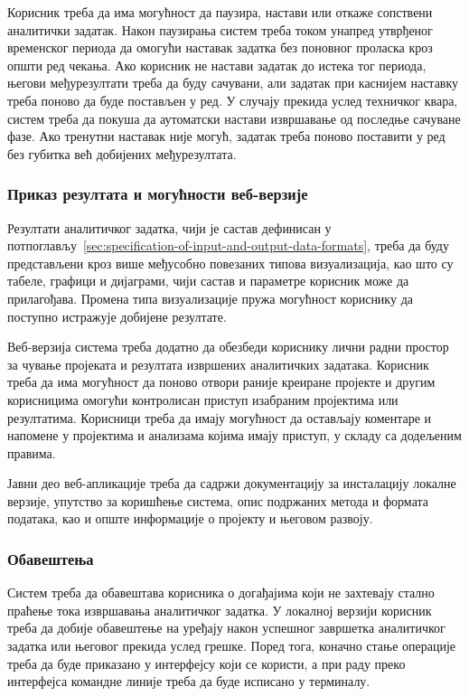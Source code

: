 \documentclass[12pt,oneside]{memoir}
\begin{document}
Корисник треба да има могућност да паузира, настави или откаже сопствени аналитички задатак. Након паузирања систем треба током унапред утврђеног временског периода да омогући наставак задатка без поновног проласка кроз општи ред чекања. Ако корисник не настави задатак до истека тог периода, његови међурезултати треба да буду сачувани, али задатак при каснијем наставку треба поново да буде постављен у ред. У случају прекида услед техничког квара, систем треба да покуша да аутоматски настави извршавање од последње сачуване фазе. Ако тренутни наставак није могућ, задатак треба поново поставити у ред без губитка већ добијених међурезултата.


\subsubsection{Приказ резултата и могућности веб-верзије}
Резултати аналитичког задатка, чији је састав дефинисан у потпоглављу~\ref{sec:specification-of-input-and-output-data-formats}, треба да буду представљени кроз више међусобно повезаних типова визуализација, као што су табеле, графици и дијаграми, чији састав и параметре корисник може да прилагођава. Промена типа визуализације пружа могућност кориснику да поступно истражује добијене резултате.

Веб-верзија система треба додатно да обезбеди кориснику лични радни простор за чување пројеката и резултата извршених аналитичких задатака. Корисник треба да има могућност да поново отвори раније креиране пројекте и другим корисницима омогући контролисан приступ изабраним пројектима или резултатима. Корисници треба да имају могућност да остављају коментаре и напомене у пројектима и анализама којима имају приступ, у складу са додељеним правима.

Јавни део веб-апликације треба да садржи документацију за инсталацију локалне верзије, упутство за коришћење система, опис подржаних метода и формата података, као и опште информације о пројекту и његовом развоју.


\subsubsection{Обавештења}
Систем треба да обавештава корисника о догађајима који не захтевају стално праћење тока извршавања аналитичког задатка. У локалној верзији корисник треба да добије обавештење на уређају након успешног завршетка аналитичког задатка или његовог прекида услед грешке. Поред тога, коначно стање операције треба да буде приказано у интерфејсу који се користи, а при раду преко интерфејса командне линије треба да буде исписано у терминалу.
\end{document}
